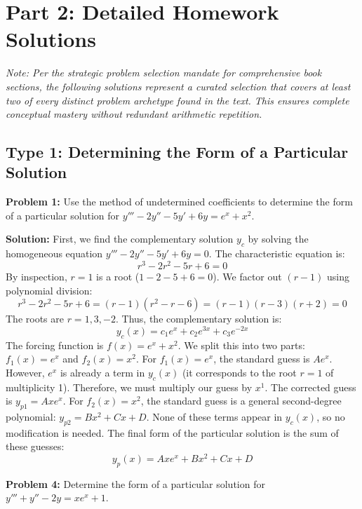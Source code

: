 \documentclass[11pt]{article}
\begin{document}
\newpage
\section{Part 2: Detailed Homework Solutions}
\textit{Note: Per the strategic problem selection mandate for comprehensive book sections, the following solutions represent a curated selection that covers at least two of every distinct problem archetype found in the text. This ensures complete conceptual mastery without redundant arithmetic repetition.}

\subsection{Type 1: Determining the Form of a Particular Solution}

\textbf{Problem 1:} Use the method of undetermined coefficients to determine the form of a particular solution for $y''' - 2y'' - 5y' + 6y = e^x + x^2$.

\textbf{Solution:}
First, we find the complementary solution $y_c$ by solving the homogeneous equation $y''' - 2y'' - 5y' + 6y = 0$.
The characteristic equation is:
\[ r^3 - 2r^2 - 5r + 6 = 0 \]
By inspection, $r = 1$ is a root ($1 - 2 - 5 + 6 = 0$). We factor out $(r - 1)$ using polynomial division:
\[ r^3 - 2r^2 - 5r + 6 = (r - 1)(r^2 - r - 6) = (r - 1)(r - 3)(r + 2) = 0 \]
The roots are $r = 1, 3, -2$. Thus, the complementary solution is:
\[ y_c(x) = c_1 e^x + c_2 e^{3x} + c_3 e^{-2x} \]
The forcing function is $f(x) = e^x + x^2$. We split this into two parts: $f_1(x) = e^x$ and $f_2(x) = x^2$.
For $f_1(x) = e^x$, the standard guess is $A e^x$. However, $e^x$ is already a term in $y_c(x)$ (it corresponds to the root $r=1$ of multiplicity 1). Therefore, we must multiply our guess by $x^1$. The corrected guess is $y_{p1} = A x e^x$.
For $f_2(x) = x^2$, the standard guess is a general second-degree polynomial: $y_{p2} = B x^2 + C x + D$. None of these terms appear in $y_c(x)$, so no modification is needed.
The final form of the particular solution is the sum of these guesses:
\[ y_p(x) = A x e^x + B x^2 + C x + D \]

\vspace{0.5cm}
\textbf{Problem 4:} Determine the form of a particular solution for $y''' + y'' - 2y = x e^x + 1$.
\end{document}
